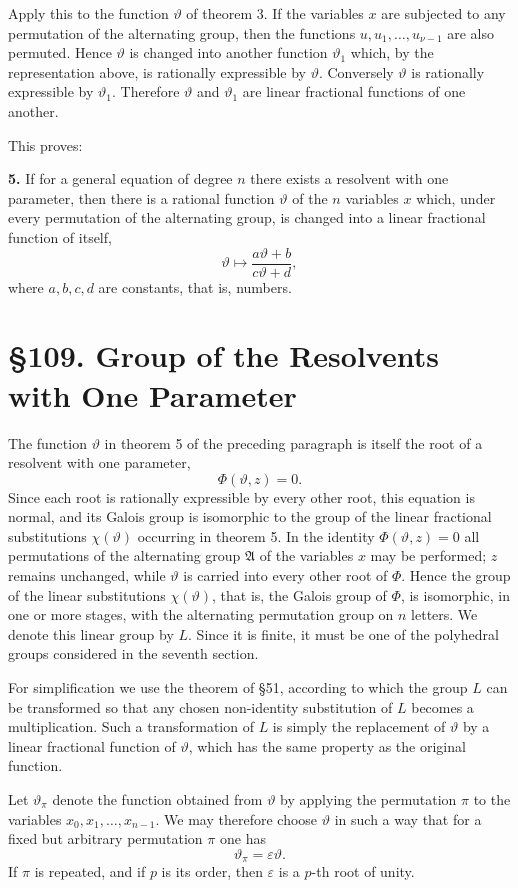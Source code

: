 \documentclass[11pt,a4paper]{book}
\newcommand{\webersection}[2]{\clearpage\section*{\S #1. #2}}
\newcommand{\A}{\mathfrak A}
\begin{document}
Apply this to the function $\vartheta$ of theorem 3.  If the variables $x$ are subjected to any permutation of the alternating group, then the functions $u,u_1,
\ldots,u_{\nu-1}$ are also permuted.  Hence $\vartheta$ is changed into another function $\vartheta_1$ which, by the representation above, is rationally expressible by $\vartheta$.  Conversely $\vartheta$ is rationally expressible by $\vartheta_1$.  Therefore $\vartheta$ and $\vartheta_1$ are linear fractional functions of one another.

This proves:

\textbf{5.} If for a general equation of degree $n$ there exists a resolvent with one parameter, then there is a rational function $\vartheta$ of the $n$ variables $x$ which, under every permutation of the alternating group, is changed into a linear fractional function of itself,
\begin{equation}
 \vartheta\longmapsto \frac{a\vartheta+b}{c\vartheta+d},
\end{equation}
where $a,b,c,d$ are constants, that is, numbers.

\webersection{109}{Group of the Resolvents with One Parameter}

The function $\vartheta$ in theorem 5 of the preceding paragraph is itself the root of a resolvent with one parameter,
\[
 \Phi(\vartheta,z)=0.
\]
Since each root is rationally expressible by every other root, this equation is normal, and its Galois group is isomorphic to the group of the linear fractional substitutions $\chi(\vartheta)$ occurring in theorem 5.  In the identity $\Phi(\vartheta,z)=0$ all permutations of the alternating group $\A$ of the variables $x$ may be performed; $z$ remains unchanged, while $\vartheta$ is carried into every other root of $\Phi$.  Hence the group of the linear substitutions $\chi(\vartheta)$, that is, the Galois group of $\Phi$, is isomorphic, in one or more stages, with the alternating permutation group on $n$ letters.  We denote this linear group by $L$.  Since it is finite, it must be one of the polyhedral groups considered in the seventh section.

For simplification we use the theorem of \S 51, according to which the group $L$ can be transformed so that any chosen non-identity substitution of $L$ becomes a multiplication.  Such a transformation of $L$ is simply the replacement of $\vartheta$ by a linear fractional function of $\vartheta$, which has the same property as the original function.

Let $\vartheta_\pi$ denote the function obtained from $\vartheta$ by applying the permutation $\pi$ to the variables $x_0,x_1,
\ldots,x_{n-1}$.  We may therefore choose $\vartheta$ in such a way that for a fixed but arbitrary permutation $\pi$ one has
\[
 \vartheta_\pi=\varepsilon\vartheta.
\]
If $\pi$ is repeated, and if $p$ is its order, then $\varepsilon$ is a $p$-th root of unity.
\end{document}

